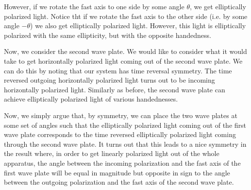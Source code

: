 However, if we rotate the fast axis to one side by some angle $\theta$, we get elliptically polarized light. Notice tht if we rotate the fast axis to the other side (i.e. by some angle $-\theta$) we also get elliptically polarized light. However, this light is elliptically polarized with the same ellipticity, but with the opposite handedness.

Now, we consider the second wave plate. We would like to consider what it would take to get horizontally polarized light coming out of the second wave plate. We can do this by noting that our system has time reversal symmetry. The time reversed outgoing horizontally polarized light turns out to be incoming horizontally polarized light. Similarly as before, the second wave plate can achieve elliptically polarized light of various handednesses.

Now, we simply argue that, by symmetry, we can place the two wave plates at some set of angles such that the elliptically polarized light coming out of the first wave plate corresponds to the time reversed elliptically polarized light coming through the second wave plate. It turns out that this leads to a nice symmetry in the result where, in order to get linearly polarized light out of the whole apparatus, the angle between the incoming polarization and the fast axis of the first wave plate will be equal in magnitude but opposite in sign to the angle between the outgoing polarization and the fast axis of the second wave plate.

